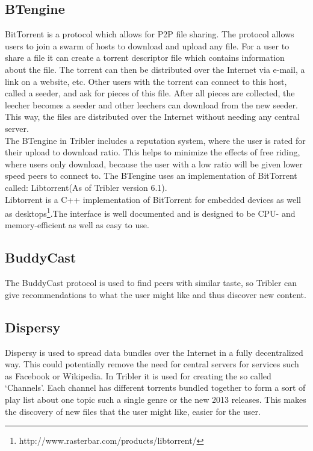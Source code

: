 \subsection{BTengine}
BitTorrent is a protocol which allows for P2P file sharing. The protocol allows users to join a swarm of hosts to download and upload any file. For a user to share a file it can create a torrent descriptor file which contains information about the file. The torrent can then be distributed over the Internet via e-mail, a link on a website, etc. Other users with the torrent can connect to this host, called a seeder, and ask for pieces of this file. After all pieces are collected, the leecher becomes a seeder and other leechers can download from the new seeder. This way, the files are distributed over the Internet without needing any central server.\\ 
The BTengine in Tribler includes a reputation system, where the user is rated for their upload to download ratio. This helps to minimize the effects of free riding, where users only download, because the user with a low ratio will be given lower speed peers to connect to. The BTengine uses an implementation of BitTorrent called: Libtorrent(As of Tribler version 6.1).\\
Libtorrent is a C++ implementation of BitTorrent for embedded devices as well as desktops\footnote{http://www.rasterbar.com/products/libtorrent/}.The interface is well documented and is designed to be CPU- and memory-efficient as well as easy to use.

\subsection{BuddyCast}
The BuddyCast protocol is used to find peers with similar taste, so Tribler can give recommendations to what the user might like and thus discover new content. 

\subsection{Dispersy}
Dispersy is used to spread data bundles over the Internet in a fully decentralized way. This could potentially remove the need for central servers for services such as Facebook or Wikipedia. In Tribler it is used for creating the so called `Channels'. Each channel has different torrents bundled together to form a sort of play list about one topic such a single genre or the new 2013 releases. This makes the discovery of new files that the user might like, easier for the user.


